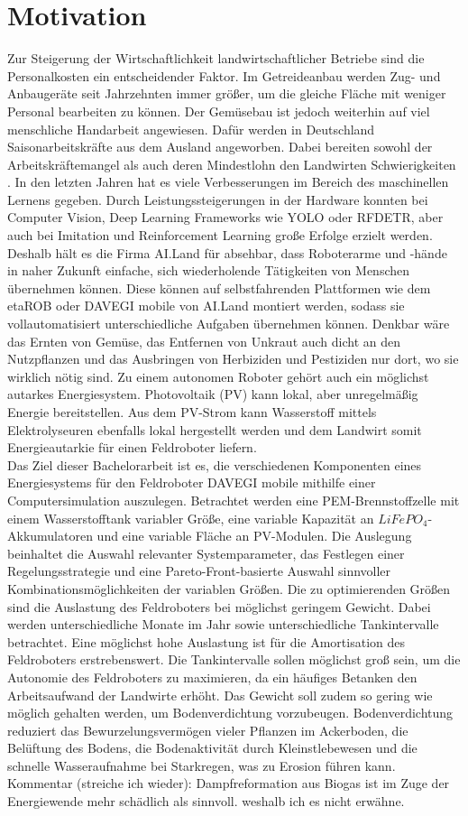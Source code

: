 \section{Motivation}
Zur Steigerung der Wirtschaftlichkeit landwirtschaftlicher Betriebe sind die Personalkosten ein entscheidender Faktor. Im Getreideanbau werden Zug- und Anbaugeräte seit Jahrzehnten immer größer, um die gleiche Fläche mit weniger Personal bearbeiten zu können. Der Gemüsebau ist jedoch weiterhin auf viel menschliche Handarbeit angewiesen. Dafür werden in Deutschland Saisonarbeitskräfte aus dem Ausland angeworben. Dabei bereiten sowohl der Arbeitskräftemangel als auch deren Mindestlohn den Landwirten Schwierigkeiten \cite{arbeitskräfte}. In den letzten Jahren hat es viele Verbesserungen im Bereich des maschinellen Lernens gegeben. Durch Leistungssteigerungen in der Hardware konnten bei Computer Vision, Deep Learning Frameworks wie YOLO oder RFDETR, aber auch bei Imitation und Reinforcement Learning große Erfolge erzielt werden. Deshalb hält es die Firma AI.Land für absehbar, dass Roboterarme und -hände in naher Zukunft einfache, sich wiederholende Tätigkeiten von Menschen übernehmen können. Diese können auf selbstfahrenden Plattformen wie dem etaROB oder DAVEGI mobile von AI.Land montiert werden, sodass sie vollautomatisiert unterschiedliche Aufgaben übernehmen können. Denkbar wäre das Ernten von Gemüse, das Entfernen von Unkraut auch dicht an den Nutzpflanzen und das Ausbringen von Herbiziden und Pestiziden nur dort, wo sie wirklich nötig sind. Zu einem autonomen Roboter gehört auch ein möglichst autarkes Energiesystem. Photovoltaik (PV) kann lokal, aber unregelmäßig Energie bereitstellen. Aus dem PV-Strom kann Wasserstoff mittels Elektrolyseuren ebenfalls lokal hergestellt werden und dem Landwirt somit Energieautarkie für einen Feldroboter liefern. \\ 

Das Ziel dieser Bachelorarbeit ist es, die verschiedenen Komponenten eines Energiesystems für den Feldroboter DAVEGI mobile mithilfe einer Computersimulation auszulegen. Betrachtet werden eine PEM-Brennstoffzelle mit einem Wasserstofftank variabler Größe, eine variable Kapazität an $LiFePO_4$-Akkumulatoren und eine variable Fläche an PV-Modulen. Die Auslegung beinhaltet die Auswahl relevanter Systemparameter, das Festlegen einer Regelungsstrategie und eine Pareto-Front-basierte Auswahl sinnvoller Kombinationsmöglichkeiten der variablen Größen. Die zu optimierenden Größen sind die Auslastung des Feldroboters bei möglichst geringem Gewicht. Dabei werden unterschiedliche Monate im Jahr sowie unterschiedliche Tankintervalle betrachtet. Eine möglichst hohe Auslastung ist für die Amortisation des Feldroboters erstrebenswert. Die Tankintervalle sollen möglichst groß sein, um die Autonomie des Feldroboters zu maximieren, da ein häufiges Betanken den Arbeitsaufwand der Landwirte erhöht. Das Gewicht soll zudem so gering wie möglich gehalten werden, um Bodenverdichtung vorzubeugen. Bodenverdichtung reduziert das Bewurzelungsvermögen vieler Pflanzen im Ackerboden, die Belüftung des Bodens, die Bodenaktivität durch Kleinstlebewesen und die schnelle Wasseraufnahme bei Starkregen, was zu Erosion führen kann. \\

Kommentar (streiche ich wieder): Dampfreformation aus Biogas ist im Zuge der Energiewende mehr schädlich als sinnvoll. weshalb ich es nicht erwähne. \\





